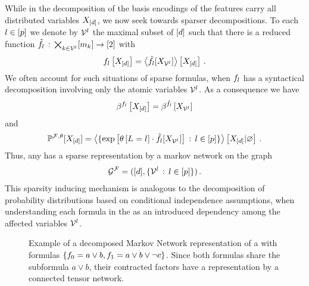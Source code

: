 While in the decomposition of  the basis encodings of the features carry all distributed variables $X_{[d]}$, we now seek towards sparser decompositions.
To each $l\in[p]$ we denote by $\mathcal{V}^{l}$ the maximal subset of $[d]$ such that there is a reduced function
$\tilde{f}_{l} \,:\,\bigtimes_{k\in\mathcal{V}^{l}}[m_{k}] \rightarrow [2]$
with
\begin{align*}
    f_{l}\left[X_{[d]}\right]
    = \left\langle \tilde{f}_{l}[X_{\mathcal{V}^{l}}]\right\rangle \left[ X_{[d]} \right] \, .
\end{align*}
We often account for such situations of sparse formulas, when $f_{l}$ has a syntactical decomposition involving only the atomic variables $\mathcal{V}^{l}$.
As a consequence we have
\begin{align*}
    \beta^{f_{l}}\left[X_{[d]}\right]
    = \beta^{\tilde{f}_{l}}\left[X_{\mathcal{V}^{l}}\right]
\end{align*}
and
\begin{align*}
    \mathbb{P}^{\mathcal{F},\theta}[X_{[d]}]
    = \left\langle \{\mathrm{exp}\left[\theta\left[L_{}=l_{}\right]\cdot\tilde{f}_{l}[X_{\mathcal{V}^{l}}]\right] \,:\, l\in[p]\}\right\rangle \left[ X_{[d]} | \varnothing \right] \, .
\end{align*}
Thus, any \MarkovLogicNetwork{} has a sparse representation by a markov network on the graph
\begin{align*}
    \mathcal{G}^{\mathcal{F}} = ([d],\{\mathcal{V}^{l} \,:\, l\in[p]\}) \, .
\end{align*}
This sparsity inducing mechanism is analogous to the decomposition of probability distributions based on conditional independence assumptions, when understanding each formula in the \MarkovLogicNetwork{} as an introduced dependency among the affected variables $\mathcal{V}^{l}$.


\begin{figure}[t]
    \begin{center}
        
    \end{center}
    \caption{Example of a decomposed Markov Network representation of a \MarkovLogicNetwork{} with formulas $\{f_{0} = a\lor b, f_{1} = a \lor b \lor \lnot c\}$.
    Since both formulas share the subformula $a\lor b$, their contracted factors have a representation by a connected tensor network.}
    \label{fig:mlnDecRep}
\end{figure}


